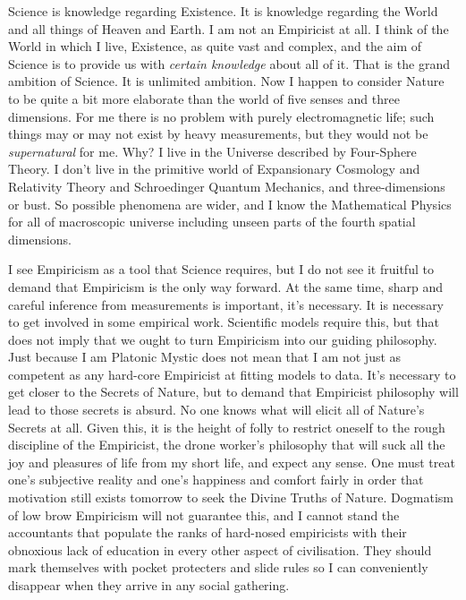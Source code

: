 \documentclass{amsart}
\begin{document}
Science is knowledge regarding Existence.  It is knowledge regarding the World and all things of Heaven and Earth.  I am not an Empiricist at all.  I think of the World in which I live, Existence, as quite vast and complex, and the aim of Science is to provide us with {\em certain knowledge} about all of it.  That is the grand ambition of Science.  It is unlimited ambition.  Now I happen to consider Nature to be quite a bit more elaborate than the world of five senses and three dimensions.  For me there is no problem with purely electromagnetic life; such things may or may not exist by heavy measurements, but they would not be {\em supernatural} for me.  Why?  I live in the Universe described by Four-Sphere Theory.  I don't live in the primitive world of Expansionary Cosmology and Relativity Theory and Schroedinger Quantum Mechanics, and three-dimensions or bust. So possible phenomena are wider, and I know the Mathematical Physics for all of macroscopic universe including unseen parts of the fourth spatial dimensions.  

I see Empiricism as a tool that Science requires, but I do not see it fruitful to demand that Empiricism is the only way forward.  At the same time, sharp and careful inference from measurements is important, it's necessary.  It is necessary to get involved in some empirical work.  Scientific models require this, but that does not imply that we ought to turn Empiricism into our guiding philosophy.  Just because I am Platonic Mystic does not mean that I am not just as competent as any hard-core Empiricist at fitting models to data.  It's necessary to get closer to the Secrets of Nature, but to demand that Empiricist philosophy will lead to those secrets is absurd.  No one knows what will elicit all of Nature's Secrets at all.  Given this, it is the height of folly to restrict oneself to the rough discipline of the Empiricist, the drone worker's philosophy that will suck all the joy and pleasures of life from my short life, and expect any sense.  One must treat one's subjective reality and one's happiness and comfort fairly in order that motivation still exists tomorrow to seek the Divine Truths of Nature.  Dogmatism of low brow Empiricism will not guarantee this, and I cannot stand the accountants that populate the ranks of hard-nosed empiricists with their obnoxious lack of education in every other aspect of civilisation.  They should mark themselves with pocket protecters and slide rules so I can conveniently disappear when they arrive in any social gathering.
\end{document}
